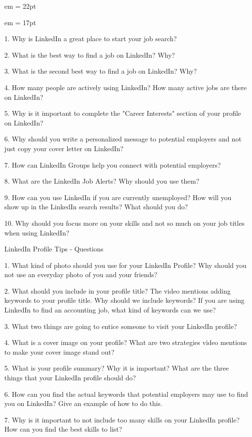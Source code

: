 

 em
\FFrk \baselineskip = 22pt



% 
 em
\FFri \baselineskip = 17pt


\par 1. Why is LinkedIn a great place to start your job search?
\par 2. What is the best way to find a job on LinkedIn? Why?
\par 3. What is the second best way to find a job on LinkedIn? Why?
\par 4. How many people are actively using LinkedIn? How many active jobs are there on LinkedIn?
\par 5. Why is it important to complete the "Career Interests" section of your profile on LinkedIn?
\par 6. Why should you write a personalized message to potential employers and not just copy your cover letter on LinkedIn?
\par 7. How can LinkedIn Groups help you connect with potential employers?
\par 8. What are the LinkedIn Job Alerts? Why should you use them?
\par 9. How can you use LinkedIn if you are currently unemployed? How will you show up in the LinkedIn search results? What should you do?
\par 10. Why should you focus more on your skills and not so much on your job titles when using LinkedIn?

\medbreak

\par LinkedIn Profile Tips - Questions
\par 1. What kind of photo should you use for your LinkedIn Profile? Why should you not use an everyday photo of you and your friends?
\par 2. What should you include in your profile title? The video mentions adding keywords to your profile title. Why should we include keywords? If you are using LinkedIn to find an accounting job, what kind of keywords can we use?
\par 3. What two things are going to entice someone to visit your LinkedIn profile?
\par 4. What is a cover image on your profile? What are two strategies video mentions to make your cover image stand out?
\par 5. What is your profile summary? Why it is important? What are the three things that your LinkedIn profile should do?
\par 6. How can you find the actual keywords that potential employers may use to find you on LinkedIn? Give an example of how to do this.
\par 7. Why is it important to not include too many skills on your LinkedIn profile? How can you find the best skills to list?

